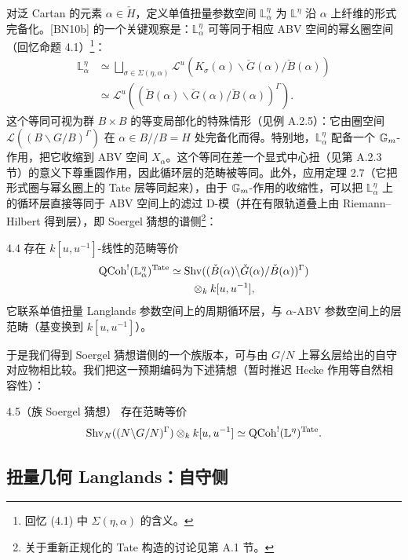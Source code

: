 对泛 Cartan 的元素 $\alpha\in\check H$，定义单值扭量参数空间 $\mathbb L^\eta_\alpha$ 为 $\mathbb L^\eta$ 沿 $\alpha$ 上纤维的形式完备化。[BN10b] 的一个关键观察是：$\mathbb L^\eta_\alpha$ 可等同于相应 ABV 空间的幂幺圈空间（回忆命题 4.1）\footnote{回忆 (4.1) 中 $\Sigma(\eta,\alpha)$ 的含义。}：
\[
\begin{aligned}
\mathbb L^\eta_\alpha&\simeq\bigsqcup_{\sigma\in\Sigma(\eta,\alpha)}\mathcal L^u(K_\sigma(\alpha)\backslash\check G(\alpha)/\check B(\alpha))\\
&\simeq\mathcal L^u((\check B(\alpha)\backslash\check G(\alpha)/\check B(\alpha))^\Gamma).
\end{aligned}
\]
这个等同可视为群 $B\times B$ 的等变局部化的特殊情形（见例 A.2.5）：它由圈空间 $\mathcal L((B\backslash G/B)^\Gamma)$ 在 $\alpha\in B//B=H$ 处完备化而得。特别地，$\mathbb L^\eta_\alpha$ 配备一个 $\mathbb{G}_m$-作用，把它收缩到 ABV 空间 $X_\alpha$。这个等同在差一个显式中心扭（见第 A.2.3 节）的意义下尊重圆作用，因此循环层的范畴被等同。此外，应用定理 2.7（它把形式圈与幂幺圈上的 Tate 层等同起来），由于 $\mathbb{G}_m$-作用的收缩性，可以把 $\mathbb L^\eta_\alpha$ 上的循环层直接等同于 ABV 空间上的滤过 D-模（并在有限轨道叠上由 Riemann--Hilbert 得到层），即 Soergel 猜想的谱侧\footnote{关于重新正规化的 Tate 构造的讨论见第 A.1 节。}：


\begin{thm}{4.4}\label{thm:a5-03-4-4}
存在 $k[u,u^{-1}]$-线性的范畴等价
\[
\begin{aligned}
\operatorname{QCoh}^{!}(\mathbb L^\eta_\alpha)^{\mathrm{Tate}}
&\simeq \mathrm{Shv}((\check B(\alpha)\backslash\check G(\alpha)/\check B(\alpha))^\Gamma)\\
&\qquad\otimes_k k[u,u^{-1}],
\end{aligned}
\]
它联系单值扭量 Langlands 参数空间上的周期循环层，与 $\alpha$-ABV 参数空间上的层范畴（基变换到 $k[u,u^{-1}]$）。
\end{thm}

于是我们得到 Soergel 猜想谱侧的一个族版本，可与由 $G/N$ 上幂幺层给出的自守对应物相比较。我们把这一预期编码为下述猜想（暂时推迟 Hecke 作用等自然相容性）：

\begin{conj}{4.5}（族 Soergel 猜想）\label{conj:a5-03-4-5}
存在范畴等价
\[
\mathrm{Shv}_N((N\backslash G/N)^\Gamma)\otimes_k k[u,u^{-1}]\simeq \operatorname{QCoh}^{!}(\mathbb L^\eta)^{\mathrm{Tate}}.
\]
\end{conj}

\subsection{扭量几何 Langlands：自守侧}

